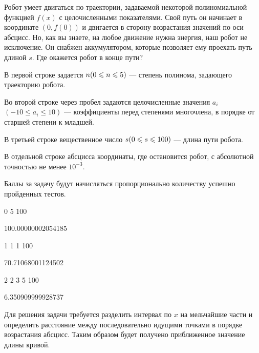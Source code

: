 
Робот умеет двигаться по траектории, задаваемой некоторой полиномиальной функцией $f(x)$ с 
целочисленными показателями. Свой путь он начинает в координате $(0, f(0))$  и двигается в 
сторону возрастания значений по оси абсцисс. Но, как вы знаете, на любое движение нужна 
энергия, наш робот не исключение. Он снабжен аккумулятором, которые позволяет ему 
проехать путь длиной $s$. Где окажется робот в конце пути?  


В первой строке задается $n \space (0 \leq n \leq 5)$  — степень полинома, задающего 
траекторию робота.

Во второй строке через пробел задаются целочисленные значения $a_i$ \linebreak $(-10 \leq a_i \leq 10)$  — 
коэффициенты перед степенями многочлена, в порядке от старшей степени к младшей.

В третьей строке вещественное число $s \space (0 \leq s \leq 100)$  — длина пути робота.

\outputfmtSection

В отдельной строке абсцисса координаты, где остановится робот, с абсолютной точностью не менее $10^{-3}$.

\markSection

Баллы за задачу будут начисляться пропорционально количеству успешно пройденных тестов.


\begin{myverbbox}[\small]{\vinput}
    0
    5
    100
\end{myverbbox}

\begin{myverbbox}[\small]{\voutput}
    100.00000002054185
\end{myverbbox}


\begin{myverbbox}[\small]{\vinput}
    1
    1 1
    100
\end{myverbbox}

\begin{myverbbox}[\small]{\voutput}
    70.71068001124502
\end{myverbbox}


\begin{myverbbox}[\small]{\vinput}
    2
    2 3 5
    100
\end{myverbbox}

\begin{myverbbox}[\small]{\voutput}
    6.350909999928737
\end{myverbbox}

\solutionSection

Для решения задачи требуется разделить интервал по $x$ на мельчайшие части и определить расстояние между последовательно идущими точками в порядке возрастания абсцисс. Таким образом будет получено приближенное значение длины кривой.

